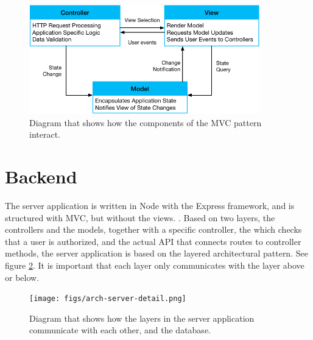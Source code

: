 \begin{figure}
    \begin{center}
        \includegraphics[width=10cm,keepaspectratio]{figs/mvc.png}
        \caption{Diagram that shows how the components of the \gls{MVC} pattern interact.}
        \label{fig:mvc}
    \end{center}
\end{figure}

\section{Backend}
The server application is written in Node with the Express framework, and is structured with \gls{MVC}, but without the views. \cite{nodejs}\cite{express}\cite[p.~432]{software-engineering}. Based on two layers, the controllers and the models, together with a specific controller, the  which checks that a user is authorized, and the actual \gls{API} that connects routes to controller methods, the server application is based on the layered architectural pattern. See figure \ref{fig:server-detail}. It is important that each layer only communicates with the layer above or below.


\begin{figure}
    \begin{center}
        \texttt{[image: figs/arch-server-detail.png]}
        \caption{Diagram that shows how the layers in the server application communicate with each other, and the database.}
        \label{fig:server-detail}
    \end{center}
\end{figure}

